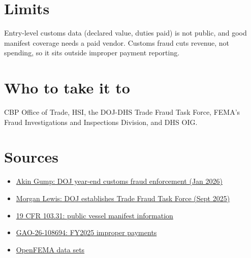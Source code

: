 \documentclass[letterpaper,11pt]{article}
\providecommand{\tightlist}{\setlength{\itemsep}{0pt}\setlength{\parskip}{0pt}}
\begin{document}
\hypertarget{limits}{%
\section{Limits}\label{limits}}

Entry-level customs data (declared value, duties paid) is not public,
and good manifest coverage needs a paid vendor. Customs fraud cuts
revenue, not spending, so it sits outside improper payment reporting.

\hypertarget{who-to-take-it-to}{%
\section{Who to take it to}\label{who-to-take-it-to}}

CBP Office of Trade, HSI, the DOJ-DHS Trade Fraud Task Force, FEMA's
Fraud Investigations and Inspections Division, and DHS OIG.

\hypertarget{sources}{%
\section{Sources}\label{sources}}

\begin{itemize}
\tightlist
\item
  \href{https://www.akingump.com/en/insights/alerts/dojs-yearend-customs-fraud-enforcement-signals-whats-ahead-in-2026}{Akin
  Gump: DOJ year-end customs fraud enforcement (Jan 2026)}
\item
  \href{https://morganlewis.com/pubs/2025/09/us-department-of-justice-establishes-trade-fraud-task-force-to-counter-tariff-evasion}{Morgan
  Lewis: DOJ establishes Trade Fraud Task Force (Sept 2025)}
\item
  \href{https://www.law.cornell.edu/cfr/text/19/103.31}{19 CFR 103.31:
  public vessel manifest information}
\item
  \href{https://www.gao.gov/products/gao-26-108694}{GAO-26-108694:
  FY2025 improper payments}
\item
  \href{https://www.fema.gov/about/openfema/data-sets}{OpenFEMA data
  sets}
\end{itemize}
\end{document}
